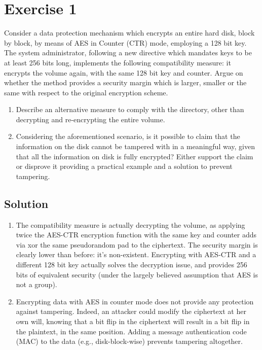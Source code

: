 \section{Exercise 1}

Consider a data protection mechanism which encrypts an entire hard disk, block by block, by means of AES in Counter (CTR) mode, employing a 128 bit key.
The system administrator, following a new directive which mandates keys to be at least 256 bits long, implements the following compatibility measure: it encrypts the volume again, with the same 128 bit key and counter. 
Argue on whether the method provides a security margin which is larger, smaller or the same with respect to the original encryption scheme. 
\begin{enumerate}
    \item Describe an alternative measure to comply with the directory, other than decrypting and re-encrypting the entire volume.
    \item Considering the aforementioned scenario, is it possible to claim that the information on the disk cannot be tampered with in a meaningful way, given that all the information on disk is fully encrypted? 
        Either support the claim or disprove it providing a practical example and a solution to prevent tampering.
\end{enumerate}

\subsection*{Solution}
\begin{enumerate}
    \item The compatibility measure is actually decrypting the volume, as applying twice the AES-CTR encryption function with the same key and counter adds via xor the same pseudorandom pad to the ciphertext. 
        The security margin is clearly lower than before: it's non-existent.
        Encrypting with AES-CTR and a different 128 bit key actually solves the decryption issue, and provides 256 bits of equivalent security (under the largely believed assumption that AES is not a group).
    \item Encrypting data with AES in counter mode does not provide any protection against tampering. 
        Indeed, an attacker could modify the ciphertext at her own will, knowing that a bit flip in the ciphertext will result in a bit flip in the plaintext, in the same position. 
        Adding a message authentication code (MAC) to the data (e.g., disk-block-wise) prevents tampering altogether.
\end{enumerate}